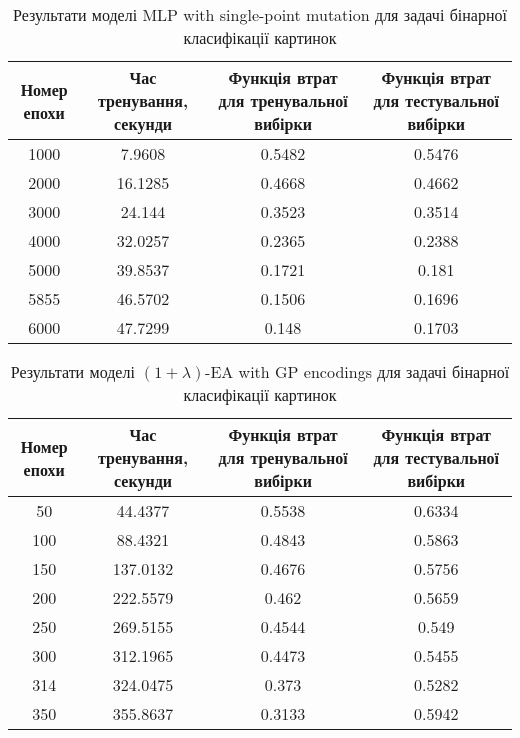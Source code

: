 \begin{table}[ht]
	\centering
	\begin{adjustbox}{max width=\textwidth}
		\begin{tabular}{|c|c|c|c|}
			\hline 
			Номер епохи & Час тренування, секунди & Функція втрат для тренувальної вибірки & Функція втрат для тестувальної вибірки \\
			\hline 
			1000 & 7.9608 & 0.5482 & 0.5476 \\
			\hline 
			2000 & 16.1285 & 0.4668 & 0.4662 \\
			\hline
			3000 & 24.144 & 0.3523 & 0.3514 \\
			\hline
			4000 & 32.0257 & 0.2365 & 0.2388 \\
			\hline
			5000 & 39.8537 & 0.1721 & 0.181 \\
			\hline
			5855 & 46.5702 & 0.1506 & 0.1696 \\
			\hline
			6000 & 47.7299 & 0.148 & 0.1703 \\
			\hline
		\end{tabular}
	\end{adjustbox}
	\caption{Результати моделі MLP with single-point mutation для задачі бінарної класифікації картинок}
	\label{mlp_spm_bc_id_results}
\end{table}

\begin{table}[ht]
	\centering
	\begin{adjustbox}{max width=\textwidth}
		\begin{tabular}{|c|c|c|c|}
			\hline 
			Номер епохи & Час тренування, секунди & Функція втрат для тренувальної вибірки & Функція втрат для тестувальної вибірки \\
			\hline 
			50 & 44.4377 & 0.5538 & 0.6334 \\
			\hline 
			100 & 88.4321 & 0.4843 & 0.5863 \\
			\hline
			150 & 137.0132 & 0.4676 & 0.5756 \\
			\hline
			200 & 222.5579 & 0.462 & 0.5659 \\
			\hline
			250 & 269.5155 & 0.4544 & 0.549 \\
			\hline
			300 & 312.1965 & 0.4473 & 0.5455 \\
			\hline
			314 & 324.0475 & 0.373 & 0.5282 \\
			\hline
			350 & 355.8637 & 0.3133 & 0.5942 \\
			\hline
		\end{tabular}
	\end{adjustbox}
	\caption{Результати моделі $(1+\lambda)$-EA with GP encodings для задачі бінарної класифікації картинок}
	\label{ea_bc_id_results}
\end{table}

